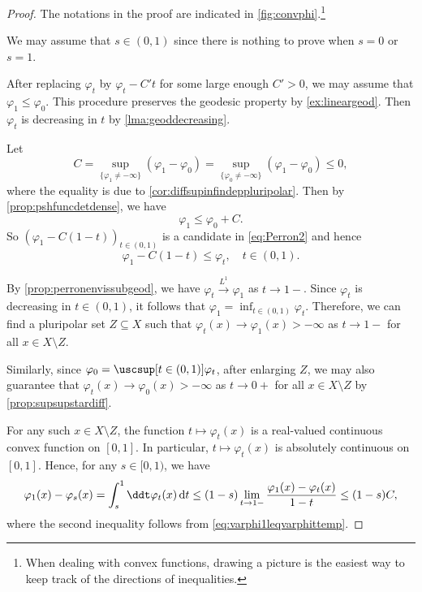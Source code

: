 \begin{proof}
The notations in the proof are indicated in \cref{fig:convphi}.\footnote{When dealing with convex functions, drawing a picture is the easiest way to keep track of the directions of inequalities.}


    We may assume that $s\in (0,1)$ since there is nothing to prove when $s=0$ or $s=1$.

    After replacing $\varphi_t$ by $\varphi_t-C't$ for some large enough $C'>0$, we may assume that $\varphi_1\leq \varphi_0$. This procedure preserves the geodesic property by \cref{ex:lineargeod}. Then $\varphi_t$ is decreasing in $t$ by \cref{lma:geoddecreasing}.

    Let
    \begin{equation}\label{eq:Cdefsupvarphi1m0temp1}
        C=\sup_{\{\varphi_1\neq -\infty\}} \left(\varphi_1-\varphi_0\right)=\sup_{\{\varphi_0\neq -\infty\}} \left(\varphi_1-\varphi_0\right)\leq 0,
    \end{equation}
    where the equality is due to \cref{cor:diffsupinfindeppluripolar}.
    Then by \cref{prop:pshfuncdetdense}, we have
    \[
        \varphi_1\leq \varphi_0+C.
    \]
    So $(\varphi_1-C(1-t))_{t\in (0,1)}$ is a candidate in \eqref{eq:Perron2} and hence
    \begin{equation}\label{eq:varphi1leqvarphittemp}
        \varphi_1-C(1-t)\leq \varphi_t,\quad t\in (0,1).
    \end{equation}

    By \cref{prop:perronenvissubgeod}, we have $\varphi_t\xrightarrow{L^1}\varphi_1$ as $t\to 1-$.
    Since $\varphi_t$ is decreasing in $t\in (0,1)$, it follows that $\varphi_1=\inf_{t\in (0,1)}\varphi_t$.
    Therefore, we can find a pluripolar set $Z\subseteq X$ such that $\varphi_t(x)\rightarrow \varphi_1(x)>-\infty$ as $t\to 1-$ for all $x\in X\setminus Z$.

    Similarly, since $\varphi_0=\uscsup[t\in (0,1)] \varphi_t$, after enlarging $Z$, we may also guarantee that $\varphi_t(x)\rightarrow \varphi_0(x)>-\infty$ as $t\to 0+$ for all $x\in X\setminus Z$ by \cref{prop:supsupstardiff}.

    For any such $x\in X\setminus Z$, the function $t\mapsto \varphi_t(x)$ is a real-valued continuous convex function on $[0,1]$. In particular, $t\mapsto \varphi_t(x)$ is absolutely continuous on $[0,1]$.
    Hence, for any $s\in [0,1)$, we have
    \begin{equation}\label{eq:varphi1minusvarphi0temp1}
        \varphi_1(x)-\varphi_s(x)=\int_s^1 \ddt \varphi_t(x)\,\mathrm{d}t\leq (1-s)\lim_{t\to 1-}\frac{\varphi_1(x)-\varphi_t(x)}{1-t}\leq (1-s)C,
    \end{equation}
    where the second inequality follows from \eqref{eq:varphi1leqvarphittemp}.


\end{proof}
